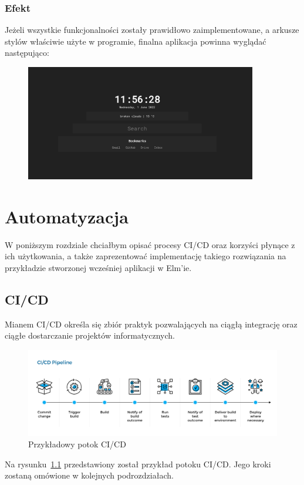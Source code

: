 \documentclass[twoside,a4paper]{report}
\begin{document}
\subsection{Efekt}
Jeżeli wszystkie funkcjonalności zostały prawidłowo zaimplementowane, a arkusze stylów właściwie użyte w programie, finalna aplikacja powinna wyglądać następująco:
\begin{figure}[H]
    \centering
    \includegraphics[width=0.9\textwidth]{img/final_app.png}
\end{figure}


\chapter{Automatyzacja}
W poniższym rozdziale chciałbym opisać procesy CI/CD oraz korzyści płynące z ich użytkowania, a także zaprezentować implementację takiego rozwiązania na przykładzie stworzonej wcześniej aplikacji w Elm'ie.

\section{CI/CD}
Mianem CI/CD określa się zbiór praktyk pozwalających na ciągłą integrację oraz ciągłe dostarczanie projektów informatycznych.
\begin{figure}[H]
    \centering
    \includegraphics[width=1\textwidth]{img/cicd_pipeline.png}
    \caption{Przykładowy potok CI/CD}\label{fig:cicd_pipeline}
\end{figure}
Na rysunku~\ref{fig:cicd_pipeline} przedstawiony został przykład potoku CI/CD\@.
Jego kroki zostaną omówione w kolejnych podrozdziałach.
\end{document}
